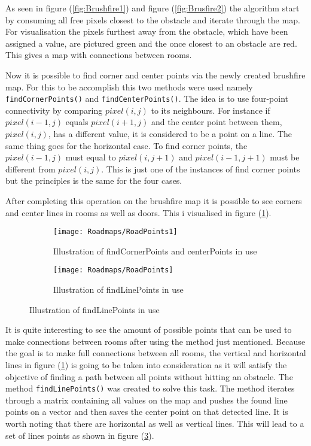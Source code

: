 \documentclass[../Head/Main.tex]{subfiles}
\begin{document}
As seen in figure (\ref{fig:Brushfire1}) and figure (\ref{fig:Brusfire2}) the algorithm start by consuming all free pixels closest to the obstacle and iterate through the map. For visualisation the pixels furthest away from the obstacle, which have been assigned a value, are pictured green and the once closest to an obstacle are red. This gives a map with connections between rooms. 
  
Now it is possible to find corner and center points via the newly created brushfire map. For this to be accomplish this two methods were used namely \texttt{findCornerPoints()} and \texttt{findCenterPoints()}. The idea is to use four-point connectivity by comparing $pixel(i,j)$ to its neighbours. For instance if $pixel(i-1,j)$ equals $pixel(i+1,j)$ and the center point between them, $pixel(i,j)$, has a different value, it is considered to be a point on a line. The same thing goes for the horizontal case. To find corner points, the $pixel(i-1,j)$ must equal to $pixel(i,j+1)$ and $pixel(i-1,j+1)$ must be different from $pixel(i,j)$. This is just one of the instances of find corner points but the principles is the same for the four cases.           

After completing this operation on the brushfire map it is possible to see corners and center lines in rooms as well as doors. This i visualised in figure (\ref{fig:CornersAndCentersOfRoom}).
  
  \begin{figure}[H]
   \begin{subfigure}[b]{0.49\textwidth}
    \centering
    \texttt{[image: Roadmaps/RoadPoints1]}
    \caption{Illustration of findCornerPoints and centerPoints in use}
    \label{fig:CornersAndCentersOfRoom}
  \end{subfigure}
  \hfill
   \begin{subfigure}[b]{0.49\textwidth}
    \centering
    \texttt{[image: Roadmaps/RoadPoints]}
    \caption{Illustration of findLinePoints in use}
    \label{fig:LinePoints}
  \end{subfigure}
  \end{figure}

It is quite interesting to see the amount of possible points that can be used to make connections between rooms after using the method just mentioned. Because the goal is to make full connections between all rooms, the vertical and horizontal lines in figure (\ref{fig:CornersAndCentersOfRoom}) is going to be taken into consideration as it will satisfy the objective of finding a path between all points without hitting an obstacle. The method \texttt{findLinePoints()} was created to solve this task. The method iterates through a matrix containing all values on the map and pushes the found line points on a vector and then saves the center point on that detected line. It is worth noting that there are horizontal as well as vertical lines. This will lead to a set of lines points as shown in figure (\ref{fig:LinePoints}). 
\end{document}
